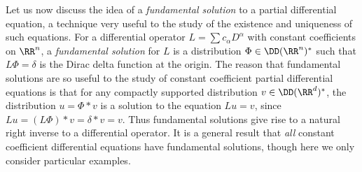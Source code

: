 Let us now discuss the idea of a \emph{fundamental solution} to a partial differential equation, a technique very useful to the study of the existence and uniqueness of such equations. For a differential operator $L = \sum c_\alpha D^\alpha$ with constant coefficients on $\RR^n$, a \emph{fundamental solution} for $L$ is a distribution $\Phi \in \DD(\RR^n)^*$ such that $L\Phi = \delta$ is the Dirac delta function at the origin. The reason that fundamental solutions are so useful to the study of constant coefficient partial differential equations is that for any compactly supported distribution $v \in \DD(\RR^d)^*$, the distribution $u = \Phi * v$ is a solution to the equation $Lu = v$, since $L u = (L \Phi) * v = \delta * v = v$. Thus fundamental solutions give rise to a natural right inverse to a differential operator. It is a general result that \emph{all} constant coefficient differential equations have fundamental solutions, though here we only consider particular examples.

